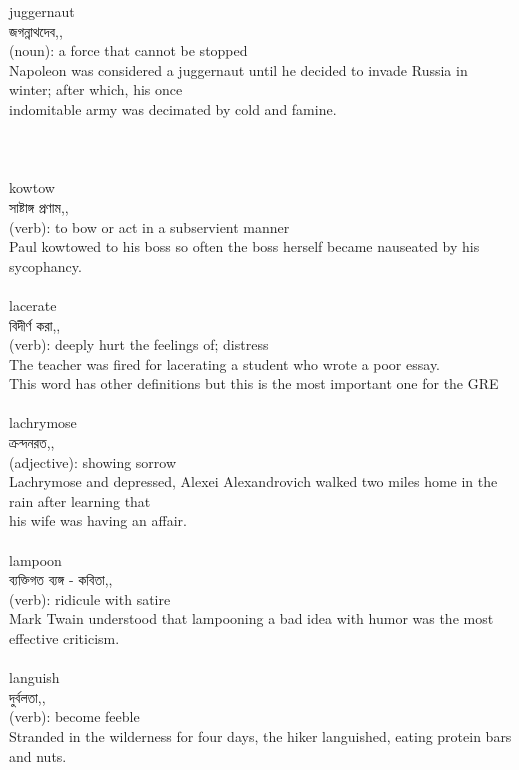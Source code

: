 \documentclass{article}
\begin{document}
{{juggernaut}\\
{জগন্নাথদেব,,}\\
{(noun): a force that cannot be stopped\\Napoleon was considered a juggernaut until he decided to invade Russia in winter; after which, his once\\indomitable army was decimated by cold and famine.\\\\                                                                               \\}\\
{kowtow}\\
{সাষ্টাঙ্গ প্রণাম,,}\\
{(verb): to bow or act in a subservient manner\\Paul kowtowed to his boss so often the boss herself became nauseated by his sycophancy.\\}\\
{lacerate}\\
{বিদীর্ণ করা,,}\\
{(verb): deeply hurt the feelings of; distress\\The teacher was fired for lacerating a student who wrote a poor essay.\\This word has other definitions but this is the most important one for the GRE\\}\\
{lachrymose}\\
{ক্রন্দনরত,,}\\
{(adjective): showing sorrow\\Lachrymose and depressed, Alexei Alexandrovich walked two miles home in the rain after learning that\\his wife was having an affair.\\}\\
{lampoon}\\
{ব্যক্তিগত ব্যঙ্গ - কবিতা,,}\\
{(verb): ridicule with satire\\Mark Twain understood that lampooning a bad idea with humor was the most effective criticism.\\}\\
{languish}\\
{দুর্বলতা,,}\\
{(verb): become feeble\\Stranded in the wilderness for four days, the hiker languished, eating protein bars and nuts.\\}\\
}
\end{document}
